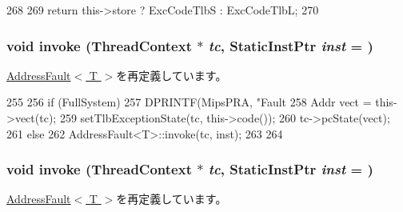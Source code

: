 \begin{DoxyCode}
268     {
269         return this->store ? ExcCodeTlbS : ExcCodeTlbL;
270     }
\end{DoxyCode}
\hypertarget{classMipsISA_1_1TlbFault_a2bd783b42262278d41157d428e1f8d6f}{
\subsubsection[{invoke}]{\setlength{\rightskip}{0pt plus 5cm}void invoke ({\bf ThreadContext} $\ast$ {\em tc}, \/  {\bf StaticInstPtr} {\em inst} = {})}}
\label{classMipsISA_1_1TlbFault_a2bd783b42262278d41157d428e1f8d6f}


\hyperlink{classMipsISA_1_1AddressFault_a2bd783b42262278d41157d428e1f8d6f}{AddressFault$<$ T $>$}を再定義しています。


\begin{DoxyCode}
255     {
256         if (FullSystem) {
257             DPRINTF(MipsPRA, "Fault %
258             Addr vect = this->vect(tc);
259             setTlbExceptionState(tc, this->code());
260             tc->pcState(vect);
261         } else {
262             AddressFault<T>::invoke(tc, inst);
263         }
264     }
\end{DoxyCode}
\hypertarget{classMipsISA_1_1TlbFault_a2bd783b42262278d41157d428e1f8d6f}{
\subsubsection[{invoke}]{\setlength{\rightskip}{0pt plus 5cm}void invoke ({\bf ThreadContext} $\ast$ {\em tc}, \/  {\bf StaticInstPtr} {\em inst} = {})}}
\label{classMipsISA_1_1TlbFault_a2bd783b42262278d41157d428e1f8d6f}


\hyperlink{classMipsISA_1_1AddressFault_a2bd783b42262278d41157d428e1f8d6f}{AddressFault$<$ T $>$}を再定義しています。


